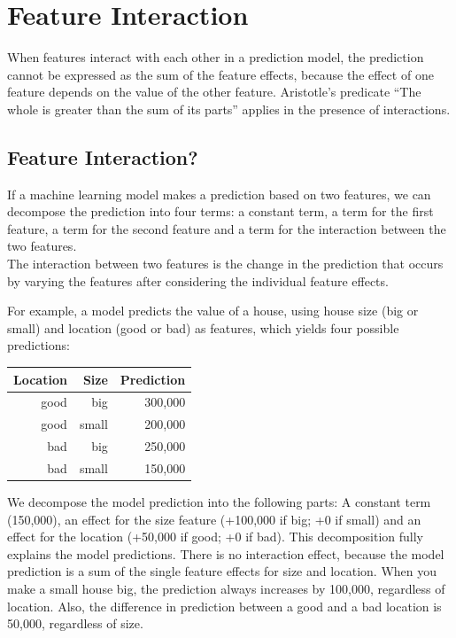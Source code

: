 \documentclass[
  11pt,
]{scrbook}
\begin{document}
\newpage

\hypertarget{interaction}{%
\section{Feature Interaction}\label{interaction}}

When features interact with each other in a prediction model, the prediction cannot be expressed as the sum of the feature effects, because the effect of one feature depends on the value of the other feature.
Aristotle's predicate ``The whole is greater than the sum of its parts'' applies in the presence of interactions.

\hypertarget{feature-interaction}{%
\subsection{Feature Interaction?}\label{feature-interaction}}

If a machine learning model makes a prediction based on two features, we can decompose the prediction into four terms:
a constant term, a term for the first feature, a term for the second feature and a term for the interaction between the two features.\\
The interaction between two features is the change in the prediction that occurs by varying the features after considering the individual feature effects.

For example, a model predicts the value of a house, using house size (big or small) and location (good or bad) as features, which yields four possible predictions:

\begin{longtable}[]{@{}rrr@{}}
\toprule
Location & Size & Prediction\tabularnewline
\midrule
\endhead
good & big & 300,000\tabularnewline
good & small & 200,000\tabularnewline
bad & big & 250,000\tabularnewline
bad & small & 150,000\tabularnewline
\bottomrule
\end{longtable}

We decompose the model prediction into the following parts:
A constant term (150,000), an effect for the size feature (+100,000 if big; +0 if small) and an effect for the location (+50,000 if good; +0 if bad).
This decomposition fully explains the model predictions.
There is no interaction effect, because the model prediction is a sum of the single feature effects for size and location.
When you make a small house big, the prediction always increases by 100,000, regardless of location.
Also, the difference in prediction between a good and a bad location is 50,000, regardless of size.
\end{document}
